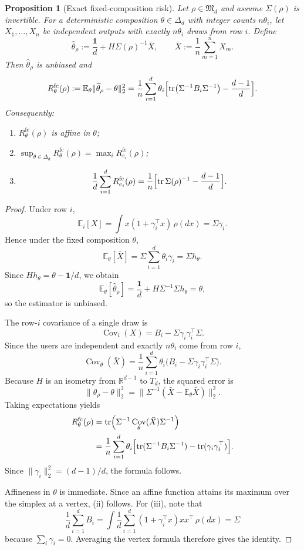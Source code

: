 \documentclass[11pt]{amsart}
\newtheorem{proposition}[proposition]{Proposition}
\theoremstyle{definition}
\DeclareMathOperator{\tr}{tr}
\DeclareMathOperator{\Cov}{Cov}
\newcommand{\one}{\mathbf 1}
\newcommand{\R}{\mathbb R}
\newcommand{\E}{\mathbb E}
\newcommand{\fM}{\mathfrak M}
\begin{document}
\begin{proposition}[Exact fixed-composition risk]\label{prop:fixed-risk}
Let $\rho\in\fM_d$ and assume $\Sigma(\rho)$ is invertible. For a deterministic composition $\theta\in\Delta_d$ with integer counts $n\theta_i$, let $X_1,\dots,X_n$ be independent outputs with exactly $n\theta_i$ draws from row $i$.
Define
\[
\widehat\theta_\rho:=\frac{\one}{d}+H\Sigma(\rho)^{-1}\bar X,
\qquad
\bar X:=\frac1n\sum_{m=1}^n X_m.
\]
Then $\widehat\theta_\rho$ is unbiased and
\[
R^{\mathrm{fc}}_\theta(\rho):=\E_\theta\|\widehat\theta_\rho-\theta\|_2^2
=\frac1n\sum_{i=1}^d \theta_i\Bigl[\tr\bigl(\Sigma^{-1}B_i\Sigma^{-1}\bigr)-\frac{d-1}{d}\Bigr].
\]
Consequently:
\begin{enumerate}[label=\textup{(\roman*)}]
\item $R^{\mathrm{fc}}_\theta(\rho)$ is affine in $\theta$;
\item $\sup_{\theta\in\Delta_d} R^{\mathrm{fc}}_\theta(\rho)=\max_i R^{\mathrm{fc}}_{e_i}(\rho)$;
\item
\[
\frac1d\sum_{i=1}^d R^{\mathrm{fc}}_{e_i}(\rho)=\frac1n\Bigl[\tr\Sigma(\rho)^{-1}-\frac{d-1}{d}\Bigr].
\]
\end{enumerate}
\end{proposition}

\begin{proof}
Under row $i$,
\[
\E_i[X]=\int x(1+\gamma_i^\top x)\,\rho(dx)=\Sigma\gamma_i.
\]
Hence under the fixed composition $\theta$,
\[
\E_\theta[\bar X]=\Sigma\sum_{i=1}^d \theta_i\gamma_i=\Sigma h_\theta.
\]
Since $Hh_\theta=\theta-\one/d$, we obtain
\[
\E_\theta[\widehat\theta_\rho]=\frac{\one}{d}+H\Sigma^{-1}\Sigma h_\theta=\theta,
\]
so the estimator is unbiased.

The row-$i$ covariance of a single draw is
\[
\Cov_i(X)=B_i-\Sigma\gamma_i\gamma_i^\top\Sigma.
\]
Since the users are independent and exactly $n\theta_i$ come from row $i$,
\[
\Cov_\theta(\bar X)=\frac1n\sum_{i=1}^d\theta_i\bigl(B_i-\Sigma\gamma_i\gamma_i^\top\Sigma\bigr).
\]
Because $H$ is an isometry from $\R^{d-1}$ to $T_d$, the squared error is
\[
\|\widehat\theta_\rho-\theta\|_2^2=\bigl\|\Sigma^{-1}(\bar X-\E_\theta\bar X)\bigr\|_2^2.
\]
Taking expectations yields
\[
\begin{aligned}
R^{\mathrm{fc}}_\theta(\rho)
&=\tr\Bigl(\Sigma^{-1}\Cov_\theta(\bar X)\Sigma^{-1}\Bigr)\\
&=\frac1n\sum_{i=1}^d\theta_i\Bigl[\tr(\Sigma^{-1}B_i\Sigma^{-1})-\tr(\gamma_i\gamma_i^\top)\Bigr].
\end{aligned}
\]
Since $\|\gamma_i\|_2^2=(d-1)/d$, the formula follows.

Affineness in $\theta$ is immediate. Since an affine function attains its maximum over the simplex at a vertex, (ii) follows. For (iii), note that
\[
\frac1d\sum_{i=1}^d B_i
=\int \frac1d\sum_{i=1}^d(1+\gamma_i^\top x)xx^\top\,\rho(dx)
=\Sigma
\]
because $\sum_i\gamma_i=0$. Averaging the vertex formula therefore gives the identity.
\end{proof}
\end{document}

